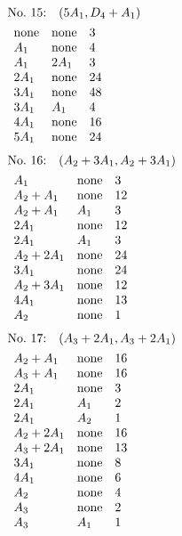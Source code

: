%
%
\begin{align*}
&\hbox to 4cm {\textrm{No.~15:}\quad$(5A_{1}, D_{4}+A_{1})$\hss}\\ 
&\begin{array}{lll}
\none & \none & 3\\
A_{1} & \none & 4\\
A_{1} & 2A_{1} & 3\\
2A_{1} & \none & 24\\
3A_{1} & \none & 48\\
3A_{1} & A_{1} & 4\\
4A_{1} & \none & 16\\
5A_{1} & \none & 24\\
\end{array}
\end{align*}
%
%
\begin{align*}
&\hbox to 4cm {\textrm{No.~16:}\quad$(A_{2}+3A_{1}, A_{2}+3A_{1})$\hss}\\ 
&\begin{array}{lll}
A_{1} & \none & 3\\
A_{2}+A_{1} & \none & 12\\
A_{2}+A_{1} & A_{1} & 3\\
2A_{1} & \none & 12\\
2A_{1} & A_{1} & 3\\
A_{2}+2A_{1} & \none & 24\\
3A_{1} & \none & 24\\
A_{2}+3A_{1} & \none & 12\\
4A_{1} & \none & 13\\
A_{2} & \none & 1\\
\end{array}
\end{align*}
%
%
\begin{align*}
&\hbox to 4cm {\textrm{No.~17:}\quad$(A_{3}+2A_{1}, A_{3}+2A_{1})$\hss}\\ 
&\begin{array}{lll}
A_{2}+A_{1} & \none & 16\\
A_{3}+A_{1} & \none & 16\\
2A_{1} & \none & 3\\
2A_{1} & A_{1} & 2\\
2A_{1} & A_{2} & 1\\
A_{2}+2A_{1} & \none & 16\\
A_{3}+2A_{1} & \none & 13\\
3A_{1} & \none & 8\\
4A_{1} & \none & 6\\
A_{2} & \none & 4\\
A_{3} & \none & 2\\
A_{3} & A_{1} & 1\\
\end{array}
\end{align*}
